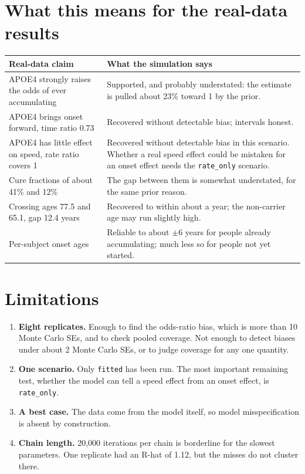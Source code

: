\documentclass[11pt]{article}
\newcommand{\code}[1]{\texttt{\small #1}}
\begin{document}
\section{What this means for the real-data results}

\begin{center}
\small
\begin{tabularx}{\textwidth}{@{}l X@{}}
\toprule
Real-data claim & What the simulation says \\
\midrule
APOE4 strongly raises the odds of ever accumulating & Supported, and probably understated: the estimate is pulled about 23\% toward 1 by the prior. \\
APOE4 brings onset forward, time ratio 0.73 & Recovered without detectable bias; intervals honest. \\
APOE4 has little effect on speed, rate ratio covers 1 & Recovered without detectable bias in this scenario. Whether a real speed effect could be mistaken for an onset effect needs the \code{rate\_only} scenario. \\
Cure fractions of about 41\% and 12\% & The gap between them is somewhat understated, for the same prior reason. \\
Crossing ages 77.5 and 65.1, gap 12.4 years & Recovered to within about a year; the non-carrier age may run slightly high. \\
Per-subject onset ages & Reliable to about $\pm 6$ years for people already accumulating; much less so for people not yet started. \\
\bottomrule
\end{tabularx}
\end{center}

\section{Limitations}

\begin{enumerate}
  \item \textbf{Eight replicates.} Enough to find the odds-ratio bias, which is more than 10 Monte Carlo SEs, and to check pooled coverage. Not enough to detect biases under about 2 Monte Carlo SEs, or to judge coverage for any one quantity.
  \item \textbf{One scenario.} Only \code{fitted} has been run. The most important remaining test, whether the model can tell a speed effect from an onset effect, is \code{rate\_only}.
  \item \textbf{A best case.} The data come from the model itself, so model misspecification is absent by construction.
  \item \textbf{Chain length.} 20,000 iterations per chain is borderline for the slowest parameters. One replicate had an R-hat of 1.12, but the misses do not cluster there.
\end{enumerate}
\end{document}
